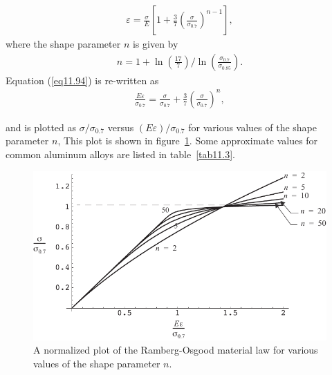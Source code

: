 \documentclass{AeroStructure-ERJohnson}
\begin{document}
\vspace*{-1pc}

\begin{align}\label{eq11.94}
\varepsilon=\frac{\sigma}{E}\left[1+\frac{3}{7}\left(\frac{\sigma}{\sigma_{0.7}}\right)^{n-1}\right],
\end{align}
where the shape parameter $n$ is given by
\begin{align}\label{eq11.95}
n=1+\ln \left(\frac{17}{7}\right)/\ln \left(\frac{\sigma_{0.7}}{\sigma_{0.85}}\right).
\end{align}
Equation (\ref{eq11.94}) is re-written as
\begin{align}\label{eq11.96}
\frac{E \varepsilon}{\sigma_{0.7}}=\frac{\sigma}{\sigma_{0.7}}+\frac{3}{7}\left(\frac{\sigma}{\sigma_{0.7}}\right)^{n},
\end{align}

\vspace*{-0.6pc}

\noindent and is plotted as $\sigma/\sigma_{0.7}$ versus $(E \varepsilon)/\sigma_{0.7}$ for various values of the shape parameter $n$, This plot is shown in figure~\ref{fig11.20}. Some approximate values for common aluminum alloys are listed in table~\ref{tab11.3}.

\begin{table}[!h]
\vspace*{-1pc}
\end{table}

\begin{figure}[!h]
\centerline{\includegraphics{Figure_11-20.pdf}}
\caption{A normalized plot of the Ramberg-Osgood material law for various values of the shape parameter $n$.} \label{fig11.20}
\end{figure}
\end{document}
